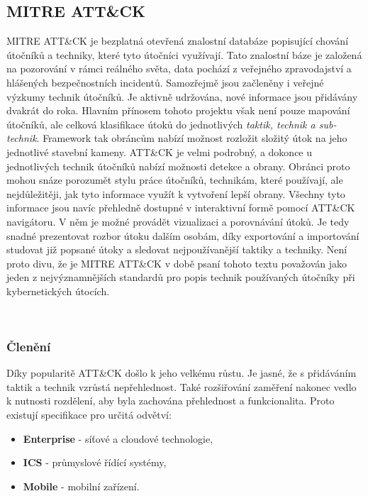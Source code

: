 \subsection{MITRE ATT\&CK}\label{subsec:mitre-att&ck}
MITRE ATT\&CK je bezplatná otevřená znalostní databáze popisující chování útočníků a techniky, které tyto útočníci využívají.
Tato znalostní báze je založená na pozorování v rámci reálného světa, data pochází z veřejného zpravodajství a hlášených bezpečnostních incidentů.
Samozřejmě jsou začleněny i veřejné výzkumy technik útočníků.
Je aktivně udržována, nové informace jsou přidávány dvakrát do roka\cite{mitre_attack_framework_faq}.
Hlavním přínosem tohoto projektu však není pouze mapování útočníků, ale celková klasifikace útoků do jednotlivých \textit{taktik, technik a sub-technik}.
Framework tak obráncům nabízí možnost rozložit složitý útok na jeho jednotlivé stavební kameny.
ATT\&CK je velmi podrobný, a dokonce u jednotlivých technik útočníků nabízí možnosti detekce a obrany.
Obránci proto mohou snáze porozumět stylu práce útočníků, technikám, které používají, ale nejdůležitěji, jak tyto informace využít k vytvoření lepší obrany.
Všechny tyto informace jsou navíc přehledně dostupné v interaktivní formě pomocí ATT\&CK navigátoru\cite{mitre_attack_navigator}.
V něm je možné provádět vizualizaci a porovnávání útoků.
Je tedy snadné prezentovat rozbor útoku dalším osobám, díky exportování a importování studovat již popsané útoky a sledovat nejpoužívanější taktiky a techniky.
Není proto divu, že je MITRE ATT\&CK v době psaní tohoto textu považován jako jeden z nejvýznamnějších standardů pro popis technik používaných útočníky při kybernetických útocích.\cite{mitre_attack_framework}

~

\subsubsection{Členění}
Díky popularitě ATT\&CK došlo k jeho velkému růstu.
Je jasné, že s přidáváním taktik a technik vzrůstá nepřehlednost.
Také rozšiřování zaměření nakonec vedlo k nutnosti rozdělení, aby byla zachována přehlednost a funkcionalita.
Proto existují specifikace pro určitá odvětví:

\begin{itemize}
	\item \textbf{Enterprise} - síťové a cloudové technologie,
	\item \textbf{ICS} - průmyslové řídící systémy,
	\item \textbf{Mobile} - mobilní zařízení.
\end{itemize}

